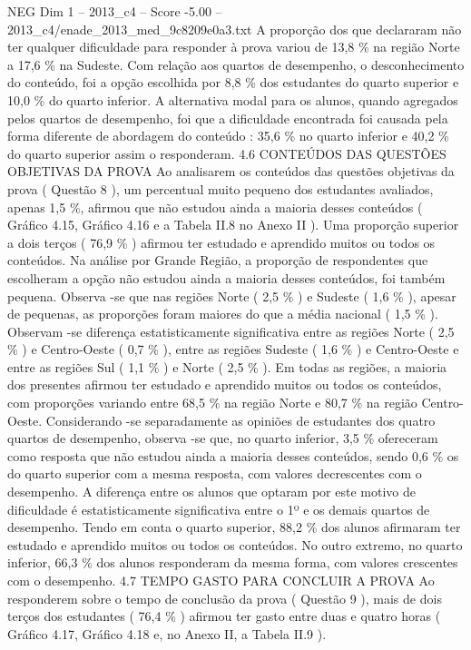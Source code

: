 \begin{textsample}{NEG Dim 1 – 2013\_c4 – Score -5.00 – 2013\_c4/enade\_2013\_med\_9c8209e0a3.txt}
A proporção dos que declararam não ter qualquer dificuldade para responder à prova variou de 13,8 \% na região Norte a 17,6 \% na Sudeste.
Com relação aos quartos de desempenho, o desconhecimento do conteúdo, foi a opção escolhida por 8,8 \% dos estudantes do quarto superior e 10,0 \% do quarto inferior.
A alternativa modal para os alunos, quando agregados pelos quartos de desempenho, foi que a dificuldade encontrada foi causada pela forma diferente de abordagem do conteúdo : 35,6 \% no quarto inferior e 40,2 \% do quarto superior assim o responderam. 4.6 CONTEÚDOS DAS QUESTÕES OBJETIVAS DA PROVA Ao analisarem os conteúdos das questões objetivas da prova ( Questão 8 ), um percentual muito pequeno dos estudantes avaliados, apenas 1,5 \%, afirmou que não estudou ainda a maioria desses conteúdos ( Gráfico 4.15, Gráfico 4.16 e a Tabela II.8 no Anexo II ).
Uma proporção superior a dois terços ( 76,9 \% ) afirmou ter estudado e aprendido muitos ou todos os conteúdos.
Na análise por Grande Região, a proporção de respondentes que escolheram a opção não estudou ainda a maioria desses conteúdos, foi também pequena.
Observa -se que nas regiões Norte ( 2,5 \% ) e Sudeste ( 1,6 \% ), apesar de pequenas, as proporções foram maiores do que a média nacional ( 1,5 \% ).
Observam -se diferença estatisticamente significativa entre as regiões Norte ( 2,5 \% ) e Centro-Oeste ( 0,7 \% ), entre as regiões Sudeste ( 1,6 \% ) e Centro-Oeste e entre as regiões Sul ( 1,1 \% ) e Norte ( 2,5 \% ).
Em todas as regiões, a maioria dos presentes afirmou ter estudado e aprendido muitos ou todos os conteúdos, com proporções variando entre 68,5 \% na região Norte e 80,7 \% na região Centro-Oeste.
Considerando -se separadamente as opiniões de estudantes dos quatro quartos de desempenho, observa -se que, no quarto inferior, 3,5 \% ofereceram como resposta que não estudou ainda a maioria desses conteúdos, sendo 0,6 \% os do quarto superior com a mesma resposta, com valores decrescentes com o desempenho.
A diferença entre os alunos que optaram por este motivo de dificuldade é estatisticamente significativa entre o 1º e os demais quartos de desempenho.
Tendo em conta o quarto superior, 88,2 \% dos alunos afirmaram ter estudado e aprendido muitos ou todos os conteúdos.
No outro extremo, no quarto inferior, 66,3 \% dos alunos responderam da mesma forma, com valores crescentes com o desempenho. 4.7 TEMPO GASTO PARA CONCLUIR A PROVA Ao responderem sobre o tempo de conclusão da prova ( Questão 9 ), mais de dois terços dos estudantes ( 76,4 \% ) afirmou ter gasto entre duas e quatro horas ( Gráfico 4.17, Gráfico 4.18 e, no Anexo II, a Tabela II.9 ).

\end{textsample}
